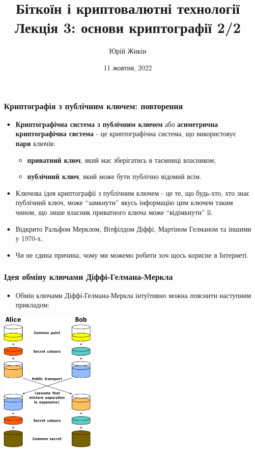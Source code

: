 \documentclass{beamer}
\title{
  Біткоїн і криптовалютні технології \\
  Лекція 3: основи криптографії 2/2
}
\author{Юрій Жикін}
\date{11 жовтня, 2022}
\begin{document}
\frame{\titlepage}

\begin{frame}
  \frametitle{Криптографія з публічним ключем: повторення}
  \begin{itemize}
  \item \textbf{Криптографічна система з публічним ключем} або \textbf{асиметрична
      криптографічна система} - це 
    криптографічна система, що використовує \textbf{пари} ключів:
    \begin{itemize}
    \item \textbf{приватний ключ}, який має зберігатись в таємниці власником,
    \item \textbf{публічний ключ}, який може бути публічно відомий всім.
    \end{itemize}
  \item Ключова ідея криптографії з публічним ключем - це те, що будь-хто, хто
    знає публічний ключ, може ``замкнути'' якусь інформацію цим ключем таким
    чином, що лише власник приватного ключа може ``відімкнути'' її.
  \item Відкрито Ральфом Мерклом, Вітфілдом Діффі, Мартіном Гелманом та іншими у
    1970-х.
  \item Чи не єдина причина, чому ми можемо робити хоч щось корисне в Інтернеті.
  \end{itemize}
\end{frame}

\begin{frame}
  \frametitle{Ідея обміну ключами Діффі-Гелмана-Меркла}
  \begin{itemize}
  \item Обмін ключами Діффі-Гелмана-Меркла інтуїтивно можна пояснити наступним
    прикладом:
  \end{itemize}
  \begin{center}
    \includegraphics[width=0.35\textwidth]{dh}
  \end{center}
\end{frame}
\end{document}
